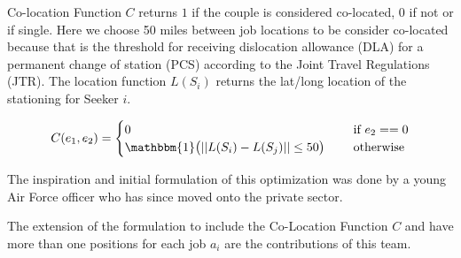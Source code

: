 Co-location Function $C$ returns $1$ if the couple is considered co-located, 0 if not or if single. Here we choose 50 miles between job locations to be consider co-located because that is the threshold for receiving dislocation allowance (DLA) for a permanent change of station (PCS) according to the Joint Travel Regulations (JTR). The location function $L(S_i)$ returns the lat/long location of the stationing for Seeker $i$. 

\[C(e_1,e_2) = \begin{cases}
0 \quad & \text{ if } e_2 == 0 \\
 \mathbbm{1}\big( || L(S_i) - L(S_j) || \leq 50 \big) \quad & \text{ otherwise }
 \end{cases}\]


The inspiration and initial formulation of this optimization was done by a young Air Force officer who has since moved onto the private sector. 

The extension of the formulation to include the Co-Location Function $C$ and have more than one positions for each job $a_i$ are the contributions of this team. 